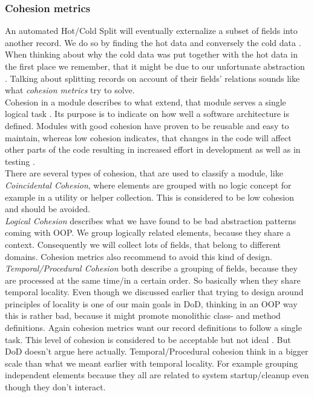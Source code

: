 \subsubsection{Cohesion metrics}
An automated Hot/Cold Split will eventually externalize a subset of fields into another record. We do so by finding the hot data and conversely the cold data . When thinking about why the cold data was put together with the hot data in the first place we remember, that it might be due to our unfortunate abstraction . Talking about splitting records on account of their fields' relations sounds like what \textit{cohesion metrics} try to solve.\\
Cohesion in a module describes to what extend, that module serves a single logical task . Its purpose is to indicate on how well a software architecture is defined. Modules with good cohesion have proven to be reusable and easy to maintain, whereas low cohesion indicates, that changes in the code will affect other parts of the code resulting in increased effort in development as well as in testing .\\
There are several types of cohesion, that are used to classify a module, like \textit{Coincidental Cohesion}, where elements are grouped with no logic concept for example in a utility or helper collection. This is considered to be low cohesion and should be avoided.\\
\textit{Logical Cohesion} describes what we have found to be bad abstraction patterns coming with OOP. We group logically related elements, because they share a context. Consequently we will collect lots of fields, that belong to different domains. Cohesion metrics also recommend to avoid this kind of design.\\
\textit{Temporal/Procedural Cohesion} both describe a grouping of fields, because they are processed at the same time/in a certain order. So basically when they share temporal locality. Even though we discussed earlier  that trying to design around principles of locality is one of our main goals in DoD, thinking in an OOP way this is rather bad, because it might promote monolithic class- and method definitions. Again cohesion metrics want our record definitions to follow a single task. This level of cohesion is considered to be acceptable but not ideal . But DoD doesn't argue here actually. Temporal/Procedural cohesion think in a bigger scale than what we meant earlier with temporal locality. For example grouping independent elements because they all are related to system startup/cleanup even though they don't interact.\\
